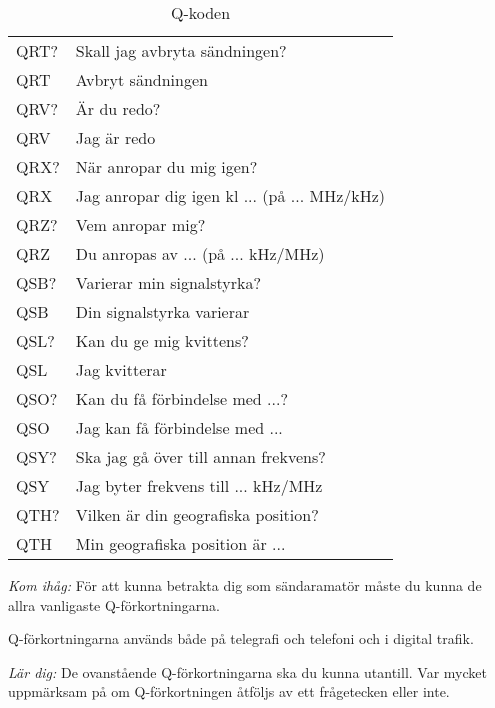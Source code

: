 \begin{table}[h]
\begin{tabular}{ll}
    QRT? & Skall jag avbryta sändningen?\\
    QRT  & Avbryt sändningen \\ \hline

    QRV? & Är du redo?\\
    QRV  & Jag är redo\\ \hline

    QRX? & När anropar du mig igen?\\
    QRX  & Jag anropar dig igen kl ... (på ... MHz/kHz)\\ \hline

    QRZ? & Vem anropar mig?\\
    QRZ  & Du anropas av ... (på ... kHz/MHz)\\ \hline

    QSB? & Varierar min signalstyrka?\\
    QSB  & Din signalstyrka varierar\\ \hline

    QSL? & Kan du ge mig kvittens?\\
    QSL  & Jag kvitterar\\ \hline

    QSO? & Kan du få förbindelse med ...?\\
    QSO  & Jag kan få förbindelse med ...\\ \hline

    QSY? & Ska jag gå över till annan frekvens?\\
    QSY  & Jag byter frekvens till ... kHz/MHz\\ \hline

    QTH? & Vilken är din geografiska position?\\
    QTH  & Min geografiska position är ...\\ \hline
  \end{tabular}
  \caption{Q-koden}
  \label{tab:q-koden}
\end{table}
\normalsize

\emph{Kom ihåg:}
För att kunna betrakta dig som sändaramatör måste du kunna de allra
vanligaste Q-förkortningarna.

Q-förkortningarna används både på telegrafi och telefoni och i digital
trafik.

\emph{Lär dig:} De ovanstående Q-förkortningarna ska du kunna
utantill. Var mycket uppmärksam på om Q-förkortningen åtföljs av ett
frågetecken eller inte.


